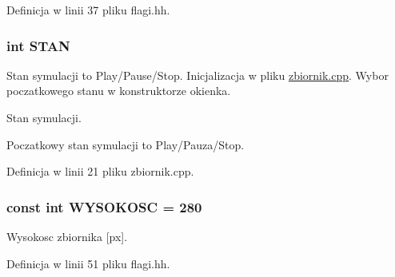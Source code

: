 Definicja w linii 37 pliku flagi.\+hh.

\hypertarget{flagi_8hh_ae3a120c63186a17e4127a68187b3e9e8}{}
\subsubsection[{S\+T\+A\+N}]{\setlength{\rightskip}{0pt plus 5cm}int S\+T\+A\+N}\label{flagi_8hh_ae3a120c63186a17e4127a68187b3e9e8}
Stan symulacji to Play/\+Pause/\+Stop. Inicjalizacja w pliku \hyperlink{zbiornik_8cpp}{zbiornik.\+cpp}. Wybor poczatkowego stanu w konstruktorze okienka.

Stan symulacji.

Poczatkowy stan symulacji to Play/\+Pauza/\+Stop. 

Definicja w linii 21 pliku zbiornik.\+cpp.

\hypertarget{flagi_8hh_a073767f0ac7dbf009a42b00de1092b52}{}
\subsubsection[{W\+Y\+S\+O\+K\+O\+S\+C}]{\setlength{\rightskip}{0pt plus 5cm}const int W\+Y\+S\+O\+K\+O\+S\+C = 280}\label{flagi_8hh_a073767f0ac7dbf009a42b00de1092b52}
Wysokosc zbiornika \mbox{[}px\mbox{]}. 

Definicja w linii 51 pliku flagi.\+hh.

